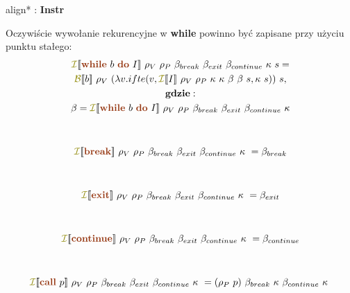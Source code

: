 \documentclass{article}
\newcommand{\sembr}[1]{[\![#1]\!]}
\newcommand{\syn}[1]{{\bf \textcolor{RawSienna}{#1}}}
\newcommand{\sem}[1]{{\bf \textcolor{olive}{#1}}}
\newcommand{\semcol}[1]{{\textcolor{olive}{#1}}}
\newcommand{\sembr}[1]{[\![#1]\!]}
\newcommand{\boxedeq}[1]{\begin{empheq}[box={\fboxsep=6pt\fbox}]{align*}#1\end{empheq}}
\newcommand{\boxedeq}[1]{\begin{empheq}[box={\fboxsep=6pt\fbox}]{align*}#1\end{empheq}}
\begin{document}
   \boxedeq{ \semcol{}: \syn{Instr} \to \sem{INSTR} }

   Oczywiście wywołanie rekurencyjne w {\bf while} powinno być zapisane przy użyciu punktu stałego:
   \begin{gather*}
      \semcol{\mathcal{I}}\sembr{\syn{while} \ b \ \syn{do} \ I}
      \ \rho_{V} \ \rho_{P} \ \beta_{break} \ \beta_{exit} \ \beta_{continue} \ \kappa \ s = \\
      \semcol{\mathcal{B}}\sembr{b} \ \rho_{V} \ (\lambda v.
      ifte(v,
      \semcol{\mathcal{I}}\sembr{I}
      \ \rho_{V} \ \rho_{P} \ \kappa \ \kappa \ \beta \ \beta \ s, \kappa \ s)) \ s, \\
      {\bf gdzie:} \\
      \beta = \semcol{\mathcal{I}}\sembr{\syn{while}\ b \ \syn{do} \ I}
      \ \rho_{V} \ \rho_{P} \ \beta_{break} \ \beta_{exit} \ \beta_{continue} \ \kappa
      \\
      \\
      \\
      \semcol{\mathcal{I}}\sembr{\syn{break}}
      \ \rho_{V} \ \rho_{P} \ \beta_{break} \ \beta_{exit} \ \beta_{continue} \ \kappa \ =
      \beta_{break}
      \\
      \\
      \\
      \semcol{\mathcal{I}}\sembr{\syn{exit}}
      \ \rho_{V} \ \rho_{P} \ \beta_{break} \ \beta_{exit} \ \beta_{continue} \ \kappa \ =
      \beta_{exit}
      \\
      \\
      \\
      \semcol{\mathcal{I}}\sembr{\syn{continue}}
      \ \rho_{V} \ \rho_{P} \ \beta_{break} \ \beta_{exit} \ \beta_{continue} \ \kappa \ =
      \beta_{continue}
      \\
      \\
      \\
      \semcol{\mathcal{I}}\sembr{\syn{call} \ p}
      \ \rho_{V} \ \rho_{P} \ \beta_{break} \ \beta_{exit} \ \beta_{continue} \ \kappa \ =
      (\rho_{P} \ p) \ \beta_{break} \ \kappa \ \beta_{continue} \ \kappa \
   \end{gather*}
\end{document}
